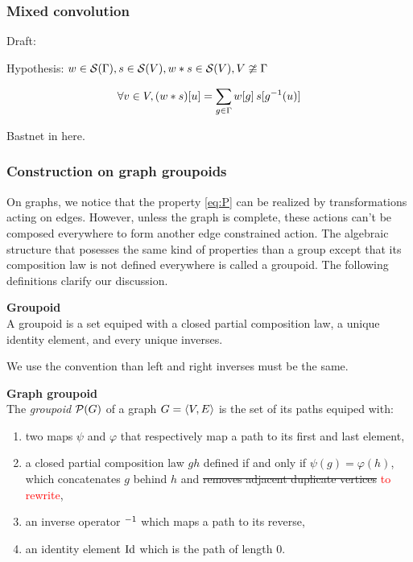 
\subsubsection{Mixed convolution}

Draft:

Hypothesis: $w \in \cs(\Gamma), s \in \cs(V), w \ast s \in \cs(V), V \ncong \Gamma$

$$
\forall v \in V, (w \ast s) [u] = \displaystyle \sum_{g \in \Gamma} w[g] \h{2} s[g^{-1}(u)]
$$

Bastnet in here.

\subsubsection{Construction on graph groupoids}


On graphs, we notice that the property \eqref{eq:P} can be realized by transformations acting on edges. However, unless the graph is complete, these actions can't be composed everywhere to form another edge constrained action. The algebraic structure that posesses the same kind of properties than a group except that its composition law is not defined everywhere is called a groupoid. The following definitions clarify our discussion.

\begin{definition}\textbf{Groupoid}\\
A groupoid is a set equiped with a closed partial composition law, a unique identity element, and every unique inverses.
\end{definition}

\begin{remark}We use the convention than left and right inverses must be the same.
\end{remark}

\begin{definition}\textbf{Graph groupoid}\\
The \emph{groupoid} $\cp(G)$ of a graph $\gve$ is the set of its paths equiped with:
\begin{enumerate}
\item two maps $\psi$ and $\varphi$ that respectively map a path to its first and last element,
\item a closed partial composition law $gh$ defined if and only if $\psi(g) = \varphi(h)$, which concatenates $g$ behind $h$ and \sout{removes adjacent duplicate vertices} \textcolor{red}{to rewrite},
\item an inverse operator $\h{0}^{-1}$ which maps a path to its reverse,
\item an identity element $\id$ which is the path of length $0$.
\end{enumerate}
\end{definition}

